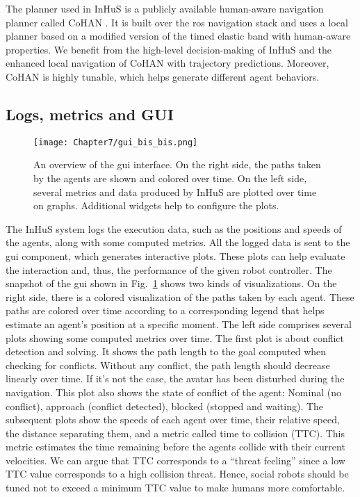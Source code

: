 The planner used in InHuS is a publicly available human-aware navigation planner called CoHAN \cite{singamaneni2021human}. It is built over the \acrshort{ros} navigation stack and uses a local planner based on a modified version of the timed elastic band with human-aware properties. 
We benefit from the high-level decision-making of InHuS and the enhanced local navigation of CoHAN with trajectory predictions. Moreover, CoHAN is highly tunable, which helps generate different agent behaviors. 

\subsection{Logs, metrics and GUI} \label{sec:logs_metrics}

\begin{figure}[!b]
    \centering
    \texttt{[image: Chapter7/gui\_bis\_bis.png]}
    \caption{
    An overview of the \acrshort{gui} interface. On the right side, the paths taken by the agents are shown and colored over time. On the left side, several metrics and data produced by InHuS are plotted over time on graphs. Additional widgets help to configure the plots. 
    }
    \label{fig:gui}
\end{figure}

The InHuS system logs the execution data, such as the positions and speeds of the agents, along with some computed metrics. All the logged data is sent to the \acrshort{gui} component, which generates interactive plots. These plots can help evaluate the interaction and, thus, the performance of the given robot controller. The snapshot of the \acrshort{gui} shown in Fig.~\ref{fig:gui} shows two kinds of visualizations. On the right side, there is a colored visualization of the paths taken by each agent. These paths are colored over time according to a corresponding legend that helps estimate an agent's position at a specific moment. The left side comprises several plots showing some computed metrics over time. The first plot is about conflict detection and solving. It shows the path length to the goal computed when checking for conflicts. Without any conflict, the path length should decrease linearly over time. If it's not the case, the avatar has been disturbed during the navigation. This plot also shows the state of conflict of the agent: Nominal (no conflict), approach (conflict detected), blocked (stopped and waiting). The subsequent plots show the speeds of each agent over time, their relative speed, the distance separating them, 
and a metric called time to collision (TTC). This metric estimates the time remaining before the agents collide with their current velocities. We can argue that TTC corresponds to a ``threat feeling'' since a low TTC value corresponds to a high collision threat. Hence, social robots should be tuned not to exceed a minimum TTC value to make humans more comfortable.

